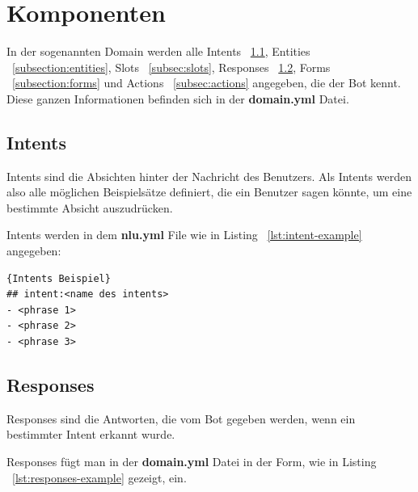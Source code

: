 \section{Komponenten}\label{sec:components}

In der sogenannten Domain werden alle Intents ~\ref{subsec:Intents}, Entities ~\ref{subsection:entities}, Slots ~\ref{subsec:slots}, Responses ~\ref{subsec:Responses}, Forms ~\ref{subsection:forms} und Actions ~\ref{subsec:actions} angegeben, die der Bot kennt.
Diese ganzen Informationen befinden sich in der \textbf{domain.yml} Datei.\cite{domain}

\subsection{Intents}\label{subsec:Intents}

Intents sind die Absichten hinter der Nachricht des Benutzers.
Als Intents werden also alle möglichen Beispielsätze definiert, die ein Benutzer sagen könnte, um eine bestimmte Absicht auszudrücken.\cite{intents}

Intents werden in dem \textbf{nlu.yml} File wie in Listing ~\ref{lst:intent-example} angegeben:

\begin{lstlisting}[label={lst:intent-example},caption={Intents Beispiel}]{Intents Beispiel}
## intent:<name des intents>
- <phrase 1>
- <phrase 2>
- <phrase 3>
\end{lstlisting}

\subsection{Responses}\label{subsec:Responses}

Responses sind die Antworten, die vom Bot gegeben werden, wenn ein bestimmter Intent erkannt wurde.\cite{responses}

Responses fügt man in der \textbf{domain.yml} Datei in der Form, wie in Listing ~\ref{lst:responses-example} gezeigt, ein.

